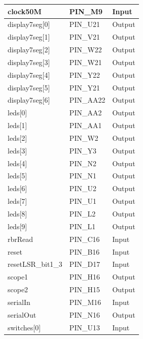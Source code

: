 \documentclass[12pt, a4paper]{article}
\begin{document}
	\begin{table}[H]
		\begin{center}
			\begin{tabular}{|l|l|l|}
				\hline
				clock50M           & PIN\_M9   & Input  \\ \hline
				display7seg{[}0{]} & PIN\_U21  & Output \\ \hline
				display7seg{[}1{]} & PIN\_V21  & Output \\ \hline
				display7seg{[}2{]} & PIN\_W22  & Output \\ \hline
				display7seg{[}3{]} & PIN\_W21  & Output \\ \hline
				display7seg{[}4{]} & PIN\_Y22  & Output \\ \hline
				display7seg{[}5{]} & PIN\_Y21  & Output \\ \hline
				display7seg{[}6{]} & PIN\_AA22 & Output \\ \hline
				leds{[}0{]}        & PIN\_AA2  & Output \\ \hline
				leds{[}1{]}        & PIN\_AA1  & Output \\ \hline
				leds{[}2{]}        & PIN\_W2   & Output \\ \hline
				leds{[}3{]}        & PIN\_Y3   & Output \\ \hline
				leds{[}4{]}        & PIN\_N2   & Output \\ \hline
				leds{[}5{]}        & PIN\_N1   & Output \\ \hline
				leds{[}6{]}        & PIN\_U2   & Output \\ \hline
				leds{[}7{]}        & PIN\_U1   & Output \\ \hline
				leds{[}8{]}        & PIN\_L2   & Output \\ \hline
				leds{[}9{]}        & PIN\_L1   & Output \\ \hline
				rbrRead            & PIN\_C16  & Input  \\ \hline
				reset              & PIN\_B16  & Input  \\ \hline
				resetLSR\_bit1\_3  & PIN\_D17  & Input  \\ \hline
				scope1             & PIN\_H16  & Output \\ \hline
				scope2             & PIN\_H15  & Output \\ \hline
				serialIn           & PIN\_M16  & Input  \\ \hline
				serialOut          & PIN\_N16  & Output \\ \hline
				switches{[}0{]}    & PIN\_U13  & Input  \\ \hline

\end{tabular}
\end{center}
\end{table}
\end{document}
